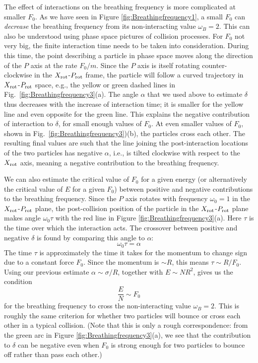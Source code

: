 \documentclass[a4paper, onecolumn]{revtex4-1}
\begin{document}
The effect of interactions on the breathing frequency is more complicated at smaller $F_0$.  As we
have seen in Figure \ref{fig:Breathingfrequency1}, a small $F_0$ can \emph{decrease} the breathing
frequency from its non-interacting value $\omega_B=2$.  This can also be understood using phase
space pictures of collision processes.  For $F_0$ not very big, the finite interaction time needs to
be taken into consideration.  During this time, the point describing a particle in phase space moves
along the direction of the $P$ axis at the rate $F_0/m$.  Since the $P$ axis is itself rotating
counter-clockwise in the $X_{\rm rot}$-$P_{\rm rot}$ frame, the particle will follow a curved
trajectory in $X_{\rm rot}$-$P_{\rm rot}$ space, e.g., the yellow or green dashed lines in
Fig.~\ref{fig:Breathingfrequency3}(a).  The angle $\alpha$ that we used above to estimate $\delta$
thus decreases with the increase of interaction time; it is smaller for the yellow line and even
opposite for the green line.  This explains the negative contribution of interaction to $\delta$,
for small enough values of $F_0$.  At even smaller values of $F_0$, shown in
Fig.~\ref{fig:Breathingfrequency3})(b), the particles cross each other.  The resulting final values
are such that the line joining the post-interaction locations of the two particles has negative
$\alpha$, i.e., is tilted clockwise with respect to the $X_{\rm rot}$ axis, meaning a negative
contribution to the breathing frequency.

We can also estimate the critical value of $F_0$ for a given energy (or alternatively the critical
value of $E$ for a given $F_0$) between positive and negative contributions to the breathing
frequency.  Since the $P$ axis rotates with frequency $\omega_0=1$ in the $X_{\rm rot}$-$P_{\rm
  rot}$ plane, the post-collision position of the particle in the $X_{\rm rot}$-$P_{\rm rot}$ plane
makes angle $\omega_0\tau$ with the red line in Figure \ref{fig:Breathingfrequency3}(a).  Here
$\tau$ is the time over which the interaction acts.  The crossover between positive and negative
$\delta$ is found by comparing this angle to $\alpha$:
\begin{equation}
\omega_0 \tau=\alpha
\end{equation}
The time $\tau$ is approximately the time it takes for the momentum to change sign due to a constant
force $F_0$.  Since the momentum is $\sim R$, this means $\tau\sim R/F_0$.  Using our previous
estimate  $\alpha\sim \sigma/R$, together with $E\sim NR^2$, gives us the condition
\begin{equation}
  \frac{E}{N} \sim F_0
  \label{eq_freq_turning_condition}
\end{equation}
for the breathing frequency to cross the non-interacting value $\omega_B=2$.  This is roughly the
same criterion for whether two particles will bounce or cross each other in a typical collision.
(Note that this is only a rough correspondence: from the green arc in Figure
\ref{fig:Breathingfrequency3}(a), we see that the contribution to $\delta$ can be negative even when
$F_0$ is strong enough for two particles to bounce off rather than pass each other.)
\end{document}
